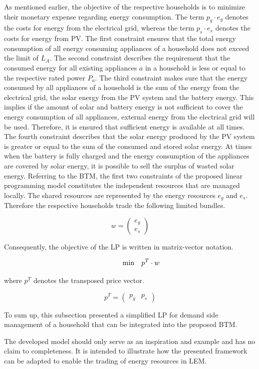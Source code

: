 As mentioned earlier,
the objective of the respective households is to minimize
their monetary expense regarding energy consumption.
The term $p_{g} \cdot e_{g}$ denotes the costs for energy from the electrical
grid, whereas the term $p_{s} \cdot e_{s}$ denotes the costs for energy from PV. 
The first constraint ensures that the total energy consumption of all energy consuming
appliances of a household does not exceed the limit of $L_{A}$. 
The second constraint describes the requirement that the consumed energy
for all existing appliances $a$ in a household is less or equal 
to the respective rated power $P_{a}$.
The third constraint makes sure that the energy consumed by all appliances
of a household is the sum of the energy from the electrical grid, the solar energy from the PV system and the battery energy. 
This implies if the amount of solar and battery energy is not sufficient to cover the energy consumption of all appliances, 
external energy from the electrical grid will be used. Therefore, it is ensured that sufficient energy is available at all times.
The fourth constraint describes that the solar energy produced by the PV system is greater or equal 
to the sum of the consumed and stored solar energy. 
At times when the battery is fully charged and the energy consumption of the 
appliances are covered by solar energy, it is possible to sell the surplus of 
wasted solar energy.
Referring to the BTM, the first two constraints of the proposed linear
programming model constitutes the independent resources that are managed locally.
The shared resources are represented by 
the energy resources $e_{g}$ and $e_{s}$.
Therefore the respective households trade the following limited bundles.

\[
w=
  \begin{pmatrix}
e_{g} \\
e_{s}
  \end{pmatrix}
\]

Consequently, the objective of the LP is written in matrix-vector notation.

\begin{equation*}
 \begin{array}{ll@{}ll}
        \text{min} & \displaystyle p^{T} \cdot w
 \end{array}
\end{equation*}

where $p^{T}$ denotes the transposed price vector.

\[
p^{T} =
  \begin{pmatrix}
p_{g} &
p_{s}
  \end{pmatrix}
\]



To sum up, this subsection presented a simplified LP for demand side management of a household
that can be integrated into the proposed BTM.

The developed model should only serve as an inspiration and example
and has no claim to completeness. 
It is intended to illustrate how the presented framework can be adapted to enable the trading of energy resources in LEM. 

\clearpage